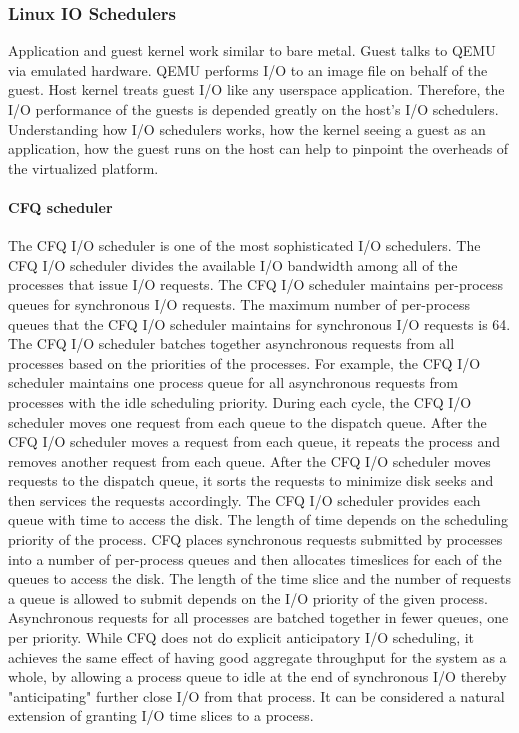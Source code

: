 \documentclass{acmsig}
\begin{document}
  \subsubsection{Linux IO Schedulers}

  Application and guest kernel work similar to bare metal. Guest talks to QEMU via emulated hardware. QEMU performs I/O to an image file on behalf of the guest. Host kernel treats guest I/O like any userspace application. Therefore, the I/O performance of the guests is depended greatly on the host's I/O schedulers. Understanding how I/O schedulers works, how the kernel seeing a guest as an application, how the guest runs on the host can help to pinpoint the overheads of the virtualized platform.

    \paragraph{CFQ scheduler}
    The CFQ I/O scheduler is one of the most sophisticated I/O schedulers. The CFQ I/O scheduler divides the available I/O bandwidth among all of the processes that issue I/O requests. The CFQ I/O scheduler maintains per-process queues for synchronous I/O requests. The maximum number of per-process queues that the CFQ I/O scheduler maintains for synchronous I/O requests is 64. The CFQ I/O scheduler batches together asynchronous requests from all processes based on the priorities of the processes. For example, the CFQ I/O scheduler maintains one process queue for all asynchronous requests from processes with the idle scheduling priority.
    During each cycle, the CFQ I/O scheduler moves one request from each queue to the dispatch queue. After the CFQ I/O scheduler moves a request from each queue, it repeats the process and removes another request from each queue. After the CFQ I/O scheduler moves requests to the dispatch queue, it sorts the requests to minimize disk seeks and then services the requests accordingly. The CFQ I/O scheduler provides each queue with time to access the disk. The length of time depends on the scheduling priority of the process.
    CFQ places synchronous requests submitted by processes into a number of per-process queues and then allocates timeslices for each of the queues to access the disk. The length of the time slice and the number of requests a queue is allowed to submit depends on the I/O priority of the given process. Asynchronous requests for all processes are batched together in fewer queues, one per priority. While CFQ does not do explicit anticipatory I/O scheduling, it achieves the same effect of having good aggregate throughput for the system as a whole, by allowing a process queue to idle at the end of synchronous I/O thereby "anticipating" further close I/O from that process. It can be considered a natural extension of granting I/O time slices to a process.
\end{document}
